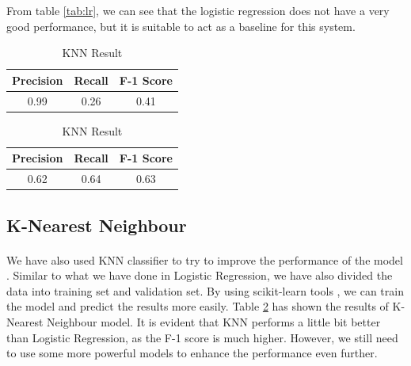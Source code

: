 \documentclass[fleqn,11pt]{olplainarticle}
\begin{document}
From table \ref{tab:lr}, we can see that the logistic regression does not have a very good performance, but it is suitable to act as a baseline for this system.

\begin{table}[H]
    \begin{minipage}{0.45\linewidth}
      \centering
    \caption{Logistic Regression Result}\label{tab:lr}
\begin{tabular}{ccc}
\toprule
Precision& Recall& F-1 Score\\
\midrule
0.99& 0.26& 0.41\\
\bottomrule
\end{tabular}
    \end{minipage}
    \begin{minipage}{0.45\linewidth}
      \centering
    \caption{KNN Result}\label{tab:knn}
\begin{tabular}{ccc}
\toprule
Precision& Recall& F-1 Score\\
\midrule
0.62& 0.64& 0.63\\
\bottomrule
\end{tabular}
    \end{minipage}
  \end{table}



\subsection{K-Nearest Neighbour}\label{knn}
\paragraph*{}
We have also used KNN classifier to try to improve the performance of the model \citep{Rebala2019}. Similar to what we have done in Logistic Regression, we have also divided the data into training set and validation set. By using scikit-learn tools \citep{scikit-learn}, we can train the model and predict the results more easily. Table \ref{tab:knn} has shown the results of K-Nearest Neighbour model. It is evident that KNN performs a little bit better than Logistic Regression, as the F-1 score is much higher. However, we still need to use some more powerful models to enhance the performance even further.
\end{document}
